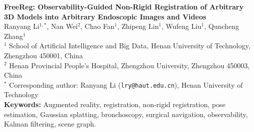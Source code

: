 \documentclass[11pt]{article}
\begin{document}
\begin{center}
{\LARGE\bfseries FreeReg: Observability-Guided Non-Rigid Registration of Arbitrary 3D Models into Arbitrary Endoscopic Images and Videos}\\[1.2em]

Ranyang Li$^{1,\ast}$,
Nan Wei$^{2}$,
Chao Fan$^{1}$,
Zhipeng Lin$^{1}$,
Wufeng Liu$^{1}$,
Quncheng Zhang$^{1}$\\[1em]

{\small
$^{1}$ School of Artificial Intelligence and Big Data, Henan University of Technology, Zhengzhou 450001, China\\
$^{2}$ Henan Provincial People's Hospital, Zhengzhou University, Zhengzhou 450003, China
}\\[1em]

{\small
$^{\ast}$ Corresponding author: Ranyang Li (\texttt{lry@haut.edu.cn}), Henan University of Technology
}\\[1.5em]

{\small\textbf{Keywords:} Augmented reality, registration, non-rigid registration, pose estimation, Gaussian splatting, bronchoscopy, surgical navigation, observability, Kalman filtering, scene graph.}
\end{center}
\end{document}
